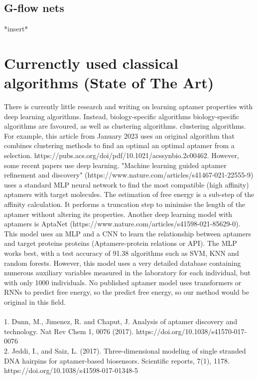 \documentclass{article}
\begin{document}
\subsection*{G-flow nets}
*insert*

\section*{Currenctly used classical algorithms (State of The Art)}
There is currently little research and writing on learning 
aptamer properties with deep learning algorithms. Instead, biology-specific algorithms 
biology-specific algorithms are favoured, as well as clustering algorithms. 
clustering algorithms. For example, this article from January 2023 uses 
an original algorithm that combines clustering methods to find an optimal 
an optimal aptamer from a selection. 
https://pubs.acs.org/doi/pdf/10.1021/acssynbio.2c00462.
However, some recent papers use deep learning. 
"Machine learning guided aptamer refinement 
and discovery" (https://www.nature.com/articles/s41467-021-22555-9) 
uses a standard MLP neural network to find the most compatible (high affinity) aptamers with target molecules. The estimation of free energy is a sub-step of the affinity calculation. It performs a 
truncation step to minimise the length of the aptamer without altering its properties. 
Another deep learning model with aptamers is AptaNet 
(https://www.nature.com/articles/s41598-021-85629-0). This model uses an 
MLP and a CNN to learn the relationship between aptamers and target proteins 
proteins (Aptamere-protein relations or API). The MLP works best, with a 
test accuracy of 91.38%
algorithms such as SVM, KNN and random forests. However, this model 
uses a very detailed database containing numerous auxiliary variables 
measured in the laboratory for each individual, but with only 1000 individuals. 
No published aptamer model uses transformers or RNNs to predict free energy, so the 
predict free energy, so our method would be original in this field.
\\\\
1.	Dunn, M., Jimenez, R. and Chaput, J. Analysis of aptamer discovery and technology. Nat Rev Chem 1, 0076 (2017). https://doi.org/10.1038/s41570-017-0076
\\
2.	Jeddi, I., and Saiz, L. (2017). Three-dimensional modeling of single stranded DNA hairpins for aptamer-based biosensors. Scientific reports, 7(1), 1178. https://doi.org/10.1038/s41598-017-01348-5
\end{document}
